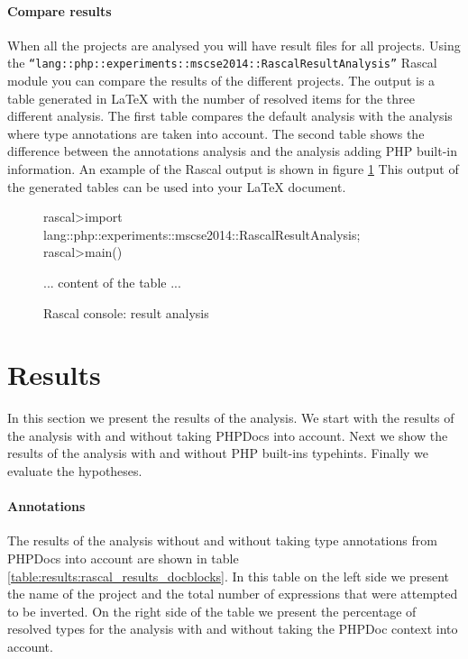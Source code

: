 \documentclass[../main.tex]{subfiles}
\begin{document}
	\paragraph{Compare results}
	When all the projects are analysed you will have result files for all projects.
	Using the \texttt{``lang::php::experiments::mscse2014::RascalResultAnalysis''} Rascal module you can compare the results of the different projects.
	The output is a table generated in \LaTeX{} with the number of resolved items for the three different analysis.
	The first table compares the default analysis with the analysis where type annotations are taken into account.
	The second table shows the difference between the annotations analysis and the analysis adding PHP built-in information.
	An example of the Rascal output is shown in figure \ref{fig:result_analysis} 
	This output of the generated tables can be used into your \LaTeX{} document.
	
	\begin{figure}[H]
	\begin{boxedverbatim}
		rascal>import lang::php::experiments::mscse2014::RascalResultAnalysis;
		rascal>main()
		\npaddmissingzero
		\npfourdigitsep
		\begin{table}[H]
		    ... content of the table ...	
		\end{table}
		\npfourdigitnosep
		\npnoaddmissingzero
	\end{boxedverbatim}
	\caption{Rascal console: result analysis}\label{fig:result_analysis}
	\end{figure}

	\section{Results}\label{sec:evaluation_results}
	
	In this section we present the results of the analysis.
	We start with the results of the analysis with and without taking PHPDocs into account.
	Next we show the results of the analysis with and without PHP built-ins typehints.
	Finally we evaluate the hypotheses.
	
	\paragraph{Annotations}
	The results of the analysis without and without taking type annotations from PHPDocs into account are shown in table \ref{table:results:rascal_results_docblocks}.
	In this table on the left side we present the name of the project and the total number of expressions that were attempted to be inverted.
	On the right side of the table we present the percentage of resolved types for the analysis with and without taking the PHPDoc context into account.
\end{document}

